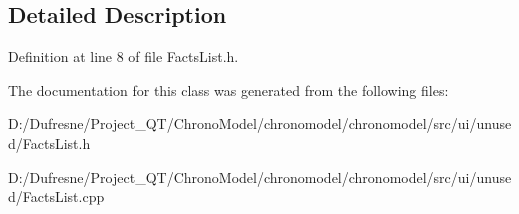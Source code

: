 \subsection{Detailed Description}


Definition at line 8 of file Facts\-List.\-h.



The documentation for this class was generated from the following files\-:\begin{DoxyCompactItemize}
\item 
D\-:/\-Dufresne/\-Project\-\_\-\-Q\-T/\-Chrono\-Model/chronomodel/chronomodel/src/ui/unused/Facts\-List.\-h\item 
D\-:/\-Dufresne/\-Project\-\_\-\-Q\-T/\-Chrono\-Model/chronomodel/chronomodel/src/ui/unused/Facts\-List.\-cpp\end{DoxyCompactItemize}
